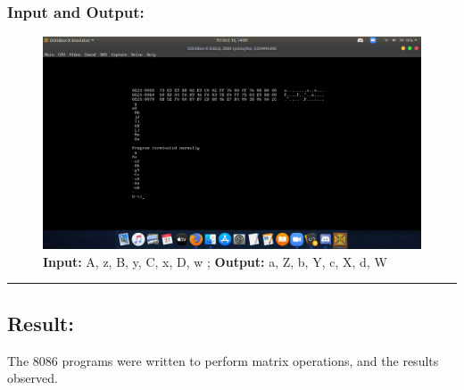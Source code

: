 \documentclass[12pt,a4paper]{article}
\begin{document}
\begin{flushleft}
\subsubsection*{\textbf{Input and Output:}}
\begin{figure}[h]
    \centering
    \includegraphics[trim = 100mm 60mm 100mm 145mm, clip, width = \textwidth]{Pics/CaseIO.png}
    \caption{ \textbf{Input:} A, z, B, y, C, x, D, w  ; \newline \hspace{1cm}
              \textbf{Output:} a, Z, b, Y, c, X, d, W}
\end{figure}
\hrule
\subsection*{\textbf{Result:}}
The 8086 programs were written to perform matrix operations, and the results observed.
\end{flushleft}
\end{document}
